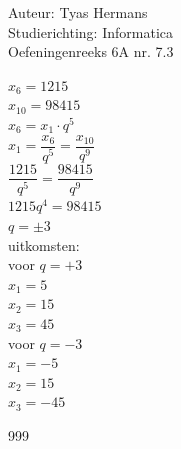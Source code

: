 \documentclass[a4paper]{article}
\begin{document}
  
\noindent \large Auteur: Tyas Hermans \\
\noindent \large Studierichting: Informatica\\
\noindent \large Oefeningenreeks 6A nr. 7.3\\

\medskip

\normalsize

$x_6 = 1215$\\

$x_10 = 98415$\\

$x_6 = x_1 \cdot q^5$\\

$x_1 = \dfrac{x_6}{q^5} = \dfrac{x_10}{q^9}$\\

$\dfrac{1215}{q^5} = \dfrac{98415}{q^9}$\\

$1215q^4 = 98415$\\

$q = \pm 3$\\

uitkomsten:\\

voor $q = +3$\\

$x_1 = 5$\\

$x_2 = 15$\\

$x_3 = 45$\\

voor $q = -3$\\

$x_1 = -5$\\

$x_2 = 15$\\

$x_3 = -45$\\






\begin{thebibliography}{999}
\end{thebibliography}
\end{document}
